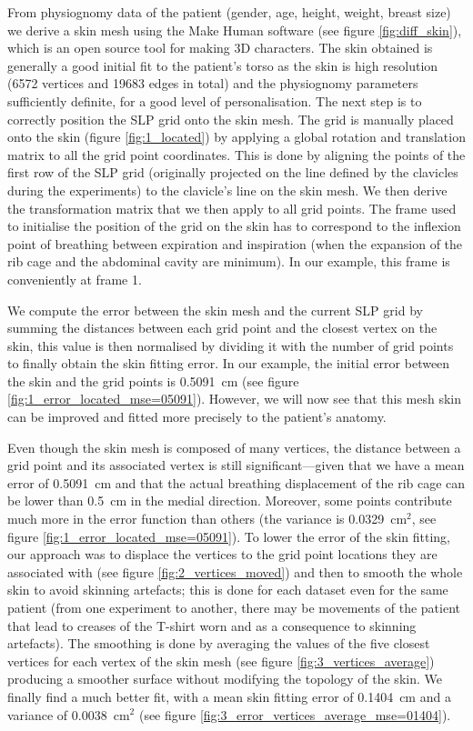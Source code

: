 From physiognomy data of the patient (gender, age, height, weight, breast size) we derive a skin mesh using the Make Human \cite{makehuman2010} software (see figure \ref{fig:diff_skin}), which is an open source tool for making 3D characters. The skin obtained is generally a good initial fit to the patient's torso as the skin is high resolution (6572 vertices and 19683 edges in total) and the physiognomy parameters sufficiently definite, for a good level of personalisation. The next step is to correctly position the SLP grid onto the skin mesh. The grid is manually placed onto the skin (figure \ref{fig:1_located}) by applying a global rotation and translation matrix to all the grid point coordinates. This is done by aligning the points of the first row of the SLP grid (originally projected on the line defined by the clavicles during the experiments) to the clavicle's line on the skin mesh. We then derive the transformation matrix that we then apply to all grid points. The frame used to initialise the position of the grid on the skin has to correspond to the inflexion point of breathing between expiration and inspiration (when the expansion of the rib cage and the abdominal cavity are minimum). In our example, this frame is conveniently at frame 1.

We compute the error between the skin mesh and the current SLP grid by summing the distances between each grid point and the closest vertex on the skin, this value is then normalised by dividing it with the number of grid points to finally obtain the skin fitting error. In our example, the initial error between the skin and the grid points is 0.5091~cm (see figure \ref{fig:1_error_located_mse=05091}). However, we will now see that this mesh skin can be improved and fitted more precisely to the patient's anatomy.

Even though the skin mesh is composed of many vertices, the distance between a grid point and its associated vertex is still significant---given that we have a mean error of 0.5091~cm and that the actual breathing displacement of the rib cage can be lower than 0.5~cm in the medial direction. Moreover, some points contribute much more in the error function than others (the variance is 0.0329~cm$^2$, see figure \ref{fig:1_error_located_mse=05091}). To lower the error of the skin fitting, our approach was to displace the vertices to the grid point locations they are associated with (see figure \ref{fig:2_vertices_moved}) and then to smooth the whole skin to avoid skinning artefacts; this is done for each dataset even for the same patient (from one experiment to another, there may be movements of the patient that lead to creases of the T-shirt worn and as a consequence to skinning artefacts). The smoothing is done by averaging the values of the five closest vertices for each vertex of the skin mesh (see figure \ref{fig:3_vertices_average}) producing a smoother surface without modifying the topology of the skin. We finally find a much better fit, with a mean skin fitting error of 0.1404~cm and a variance of 0.0038~cm$^2$ (see figure \ref{fig:3_error_vertices_average_mse=01404}).

